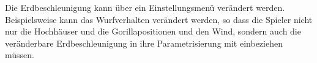 Die Erdbeschleunigung kann über ein Einstellungsmenü verändert werden. Beispielsweise kann das Wurfverhalten verändert
werden, so dass die Spieler nicht nur die Hochhäuser und die Gorillapositionen und den Wind, sondern
auch die veränderbare Erdbeschleunigung in ihre Parametrisierung mit einbeziehen müssen.